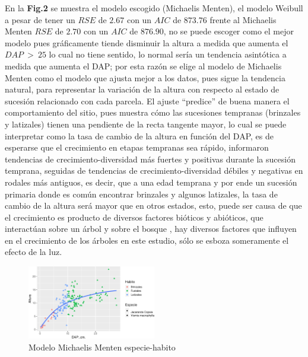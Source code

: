 \documentclass[letterpaper,9pt,twocolumn,twoside,]{pinp}
\begin{document}
En la \textbf{Fig.2} se muestra el modelo escogido (Michaelis Menten),
el modelo Weibull a pesar de tener un \(RSE\) de \(2.67\) con un \(AIC\)
de \(873.76\) frente al Michaelis Menten \(RSE\) de \(2.70\) con un
\(AIC\) de \(876.90\), no se puede escoger como el mejor modelo pues
gráficamente tiende disminuir la altura a medida que aumenta el
\(DAP \ > \ 25\) lo cual no tiene sentido, lo normal sería un tendencia
asintótica a medida que aumenta el DAP; por esta razón se elige al
modelo de Michaelis Menten como el modelo que ajusta mejor a los datos,
pues sigue la tendencia natural, para representar la variación de la
altura con respecto al estado de sucesión relacionado con cada parcela.
El ajuste ``predice'' de buena manera el comportamiento del sitio, pues
muestra cómo las sucesiones tempranas (brinzales y latizales) tienen una
pendiente de la recta tangente mayor, lo cual se puede interpretar como
la tasa de cambio de la altura en función del DAP, es de esperarse que
el crecimiento en etapas tempranas sea rápido, \citep{lasky} informaron
tendencias de crecimiento-diversidad más fuertes y positivas durante la
sucesión temprana, seguidas de tendencias de crecimiento-diversidad
débiles y negativas en rodales más antiguos, es decir, que a una edad
temprana y por ende un sucesión primaria donde es común encontrar
brinzales y algunos latizales, la tasa de cambio de la altura será mayor
que en otros estados, esto, puede ser causa de que el crecimiento es
producto de diversos factores bióticos y abióticos, que interactúan
sobre un árbol y sobre el bosque \citep{forest}, hay diversos factores
que influyen en el crecimiento de los árboles en este estudio, sólo se
esboza someramente el efecto de la luz.


\begin{figure}

{\centering \includegraphics[width=0.5\textwidth]{report_ecology_files/figure-latex/unnamed-chunk-6-1} 

}

\caption{Modelo Michaelis Menten especie-habito}\label{fig:unnamed-chunk-6}
\end{figure}
\end{document}
